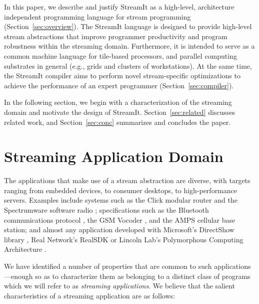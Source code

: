 \documentclass[final]{ijpp}
\begin{document}
In  this paper,  we describe  and  justify StreamIt  as a  high-level,
architecture independent  programming language for  stream programming
(Section~\ref{sec:overview}).   The StreamIt  language is  designed to
provide  high-level   stream  abstractions  that   improve  programmer
productivity  and  program  robustness  within the  streaming  domain.
Furthermore, it is intended to  serve as a common machine language for
tile-based  processors, and parallel  computing substrates  in general
(e.g., grids  and clusters  of workstations).  At  the same  time, the
StreamIt compiler aims  to perform novel stream-specific optimizations
to    achieve    the    performance    of   an    expert    programmer
(Section~\ref{sec:compiler}).

In  the following  section, we  begin with  a characterization  of the
streaming    domain   and   motivate    the   design    of   StreamIt.
Section~\ref{sec:related}     discusses      related     work,     and
Section~\ref{sec:conc} summarizes and concludes the paper.


\section{Streaming Application Domain}
\label{sec:domain}

The applications  that make use  of a stream abstraction  are diverse,
with targets  ranging from embedded devices, to  consumer desktops, to
high-performance servers.  Examples include  systems such as the Click
modular router \cite{click} and the Spectrumware software radio
\cite{spectrumware,softwareradio};   specifications    such   as   the
Bluetooth communications protocol \cite{bluetooth}, the GSM Vocoder
\cite{gsm}, and the AMPS cellular base station\cite{amps}; and almost
any application developed with Microsoft's DirectShow library
\cite{directshow}, Real Network's RealSDK \cite{realsdk} or Lincoln
Lab's Polymorphous Computing Architecture \cite{pca}.


We  have identified a  number of  properties that  are common  to such
applications---enough  so as to  characterize them  as belonging  to a
distinct class of  programs which we will refer  to as \emph{streaming
applications}.   We  believe that  the  salient  characteristics of  a
streaming application are as follows:
\end{document}
